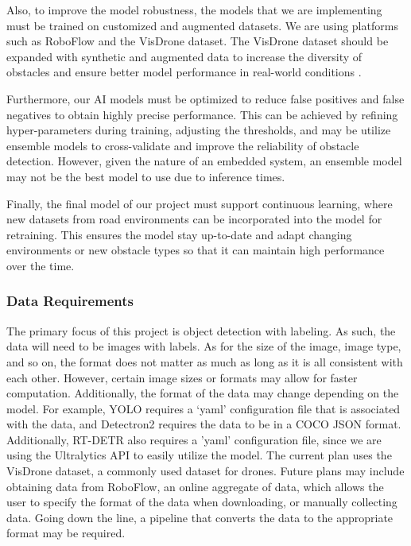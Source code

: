 \documentclass[stu,12pt,floatsintext]{apa7}
\begin{document}
Also, to improve the model robustness, the models that we are implementing must be trained on customized and augmented datasets. We are using platforms such as RoboFlow and the VisDrone dataset. The VisDrone dataset should be expanded with synthetic and augmented data to increase the diversity of obstacles and ensure better model performance in real-world conditions \parencite{zhu2021detection}.

Furthermore, our AI models must be optimized to reduce false positives and false negatives to obtain highly precise performance. This can be achieved by refining hyper-parameters during training, adjusting the thresholds, and may be utilize ensemble models to cross-validate and improve the reliability of obstacle detection. However, given the nature of an embedded system, an ensemble model may not be the best model to use due to inference times.

Finally, the final model of our project must support continuous learning, where new datasets from road environments can be incorporated into the model for retraining. This ensures the model stay up-to-date and adapt changing environments or new obstacle types so that it can maintain high performance over the time.

\subsubsection{Data Requirements}
The primary focus of this project is object detection with labeling. As such, the data will need to be images with labels. As for the size of the image, image type, and so on, the format does not matter as much as long as it is all consistent with each other. However, certain image sizes or formats may allow for faster computation. Additionally, the format of the data may change depending on the model. For example, YOLO requires a `yaml' configuration file that is associated with the data, and Detectron2 requires the data to be in a COCO JSON format. Additionally, RT-DETR also requires a 'yaml' configuration file, since we are using the Ultralytics API to easily utilize the model. The current plan uses the VisDrone dataset, a commonly used dataset for drones. Future plans may include obtaining data from RoboFlow, an online aggregate of data, which allows the user to specify the format of the data when downloading, or manually collecting data. Going down the line, a pipeline that converts the data to the appropriate format may be required.
\end{document}
